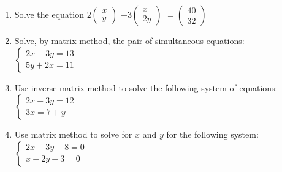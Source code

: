 \begin{enumerate}
	\item Solve the equation $2
	\begin{pmatrix}
	x \\
	y
	\end{pmatrix}$ $+ 3
	\begin{pmatrix}
	x \\
	2y
	\end{pmatrix}$ $=
	\begin{pmatrix}
	40 \\
	32
	\end{pmatrix}$
	
	\item Solve, by matrix method, the pair of simultaneous equations:\\
	$\left\{
	\begin{array}{l}
	2x - 3y = 13\\
	5y + 2x = 11
	\end{array} \right.$
	
	\item Use inverse matrix method to solve the following system of equations:\\
	$\left\{
	\begin{array}{l}
	2x + 3y = 12\\
	3x = 7 + y
	\end{array} \right.$
	
	\item Use matrix method to solve for $x$ and $y$ for the following system:\\
	$\left\{
	\begin{array}{l}
	2x + 3y - 8 = 0\\
	x - 2y + 3 = 0
	\end{array} \right.$
	
	
\end{enumerate}	
	
	
	
	
